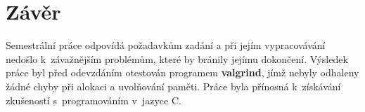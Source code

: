 \section{Závěr}

Semestrální práce odpovídá požadavkům zadání a při jejím vypracovávání nedošlo k~závažnějším problémům, které by bránily
jejímu dokončení. Výsledek práce byl před odevzdáním otestován programem \textbf{valgrind}, jímž nebyly odhaleny žádné
chyby při alokaci a uvolňování paměti. Práce byla přínosná k~získávání zkušeností s~programováním v~jazyce C.
